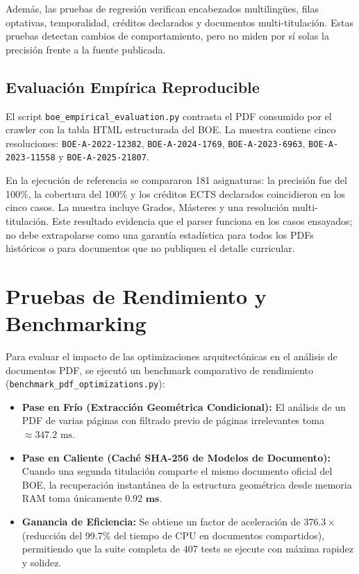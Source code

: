 Además, las pruebas de regresión verifican encabezados multilingües, filas optativas, temporalidad, créditos declarados y documentos multi-titulación. Estas pruebas detectan cambios de comportamiento, pero no miden por sí solas la precisión frente a la fuente publicada.

\subsection{Evaluación Empírica Reproducible}
El script \texttt{boe\_empirical\_evaluation.py} contrasta el PDF consumido por el crawler con la tabla HTML estructurada del BOE. La muestra contiene cinco resoluciones: \texttt{BOE-A-2022-12382}, \texttt{BOE-A-2024-1769}, \texttt{BOE-A-2023-6963}, \texttt{BOE-A-2023-11558} y \texttt{BOE-A-2025-21807}.

En la ejecución de referencia se compararon 181 asignaturas: la precisión fue del 100\%, la cobertura del 100\% y los créditos ECTS declarados coincidieron en los cinco casos. La muestra incluye Grados, Másteres y una resolución multi-titulación. Este resultado evidencia que el parser funciona en los casos ensayados; no debe extrapolarse como una garantía estadística para todos los PDFs históricos o para documentos que no publiquen el detalle curricular.

\section{Pruebas de Rendimiento y Benchmarking}
Para evaluar el impacto de las optimizaciones arquitectónicas en el análisis de documentos PDF, se ejecutó un benchmark comparativo de rendimiento (\texttt{benchmark\_pdf\_optimizations.py}):
\begin{itemize}
    \item \textbf{Pase en Frío (Extracción Geométrica Condicional):} El análisis de un PDF de varias páginas con filtrado previo de páginas irrelevantes toma $\approx 347.2\text{ ms}$.
    \item \textbf{Pase en Caliente (Caché SHA-256 de Modelos de Documento):} Cuando una segunda titulación comparte el mismo documento oficial del BOE, la recuperación instantánea de la estructura geométrica desde memoria RAM toma únicamente $\mathbf{0.92\text{ ms}}$.
    \item \textbf{Ganancia de Eficiencia:} Se obtiene un factor de aceleración de $\mathbf{376.3\times}$ (reducción del 99.7\% del tiempo de CPU en documentos compartidos), permitiendo que la suite completa de 407 tests se ejecute con máxima rapidez y solidez.
\end{itemize}

